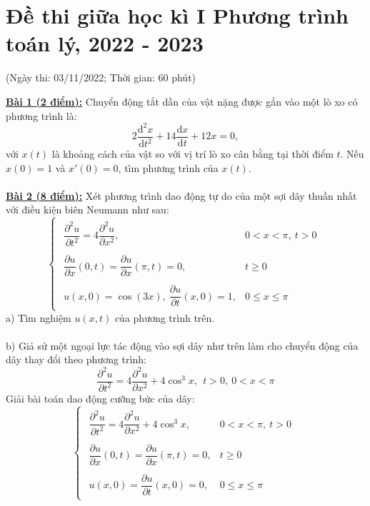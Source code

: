 \documentclass[10.5pt, a4paper]{article}
\begin{document}
\section{Đề thi giữa học kì I Phương trình toán lý, 2022 - 2023}
\begin{center}
	\color{blue}(Ngày thi: 03/11/2022; Thời gian: 60 phút)
\end{center}
\color{red}\underline{\textbf{Bài 1 (2 điểm):}} \color{black}Chuyển động tắt dần của vật nặng được gắn vào một lò xo có phương trình là: $$2\dfrac{\text{d}^2x}{\text{d}t^2}+14\dfrac{\text{d}x}{\text{d}t}+12x=0,$$
với $x(t)$ là khoảng cách của vật so với vị trí lò xo cân bằng tại thời điểm $t$. Nếu $x(0)=1$ và $x'(0)=0$, tìm phương trình của $x(t)$.\\\\
\color{red}\underline{\textbf{Bài 2 (8 điểm):}} \color{black}Xét phương trình dao động tự do của một sợi dây thuần nhất với điều kiện biên Neumann như sau: $$\begin{cases}
\begin{array}{ll}
	\dfrac{\partial^2u}{\partial t^2}=4\dfrac{\partial^2u}{\partial x^2}, & 0<x<\pi,~t>0\\\\
	\dfrac{\partial u}{\partial x}(0,t)=\dfrac{\partial u}{\partial x}(\pi,t)=0, & t\ge0\\\\
	u(x,0)=\cos(3x),~\dfrac{\partial u}{\partial t}(x,0)=1, & 0\le x\le\pi
\end{array}
\end{cases}$$
\color{red}a) \color{black}Tìm nghiệm $u(x,t)$ của phương trình trên.\\\\
\color{red}b) \color{black}Giả sử một ngoại lực tác động vào sợi dây như trên làm cho chuyển động của dây thay đổi theo phương trình: $$\dfrac{\partial^2u}{\partial t^2}=4\dfrac{\partial^2u}{\partial x^2}+4\cos^3x,~~t>0,~0<x<\pi$$
Giải bài toán dao động cưỡng bức của dây: $$\begin{cases}
\begin{array}{ll}
	\dfrac{\partial^2u}{\partial t^2}=4\dfrac{\partial^2u}{\partial x^2}+4\cos^3x, & 0<x<\pi,~t>0\\\\
	\dfrac{\partial u}{\partial x}(0,t)=\dfrac{\partial u}{\partial x}(\pi,t)=0, & t\ge0\\\\
	u(x,0)=\dfrac{\partial u}{\partial t}(x,0)=0, & 0\le x\le\pi
	\end{array}
\end{cases}$$
\end{document}
